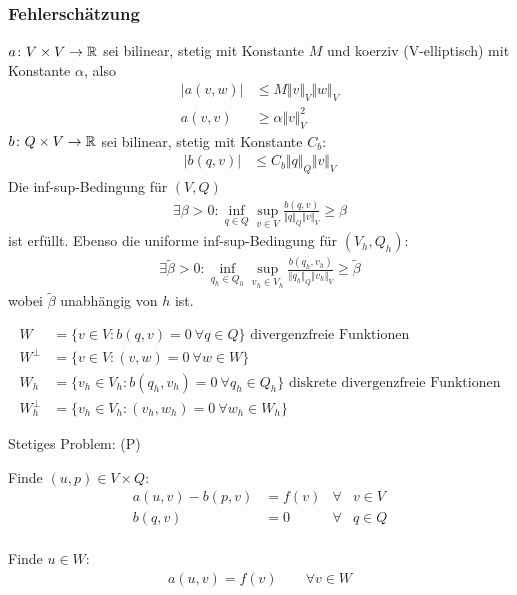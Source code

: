 \subsubsection*{Fehlerschätzung}
$a\colon V\times V\to\mathbb{R}$ sei bilinear, stetig mit Konstante $M$ und koerziv (V-elliptisch) mit Konstante $\alpha$, also
\begin{align*}
	\big|a(v,w)\big|&\leq M\Vert v\Vert_V\Vert w\Vert_V\\
	a(v,v)&\geq\alpha\Vert v\Vert_V^2
\end{align*}
$b\colon Q\times V\to\mathbb{R}$ sei bilinear, stetig mit Konstante $C_b$:
\begin{align*}
	\big|b(q,v)\big|&\leq C_b\Vert q\Vert_Q\Vert v\Vert_V
\end{align*}
Die inf-sup-Bedingung für $(V,Q)$
\begin{align*}
	\exists\beta>0:\inf\limits_{q\in Q}\sup\limits_{v\in V}\frac{b(q,v)}{\Vert q\Vert_Q\Vert v\Vert_V}\geq\beta
\end{align*}
ist erfüllt. Ebenso die uniforme inf-sup-Bedingung für $(V_h,Q_h)$:
\begin{align*}
	\exists\tilde{\beta}>0:\inf\limits_{q_h\in Q_h}\sup\limits_{v_h\in V_h}\frac{b(q_h,v_h)}{\Vert q_h\Vert_Q\Vert v_h\Vert_V}\geq\tilde{\beta}
\end{align*}
wobei $\tilde{\beta}$ unabhängig von $h$ ist.

\begin{align*}
	W&=\Big\lbrace v\in V:b(q,v)=0~\forall q\in Q\Big\rbrace\text{ divergenzfreie Funktionen}\\
	W^\perp&=\Big\lbrace v\in V:(v,w)=0~\forall w\in W\Big\rbrace\\
	W_h&=\Big\lbrace v_h\in V_h:b(q_h,v_h)=0~\forall q_h\in Q_h\Big\rbrace\text{ diskrete divergenzfreie Funktionen}\\
	W_h^\perp&=\Big\lbrace v_h\in V_h:(v_h,w_h)=0~\forall w_h\in W_h\Big\rbrace
\end{align*}

Stetiges Problem: (P)

\begin{minipage}[t]{0.49\textwidth}
	Finde $(u,p)\in V\times Q$:
	\begin{align*}
		a(u,v)-b(p,v)&=f(v) &\forall&v\in V\\
		b(q,v)&=0 &\forall& q\in Q\\
	\end{align*}
\end{minipage} %
\begin{minipage}[t]{0.49\textwidth}
	Finde $u\in W$:
	\begin{align*}
		a(u,v)=f(v)\qquad\forall v\in W
	\end{align*}
\end{minipage}

